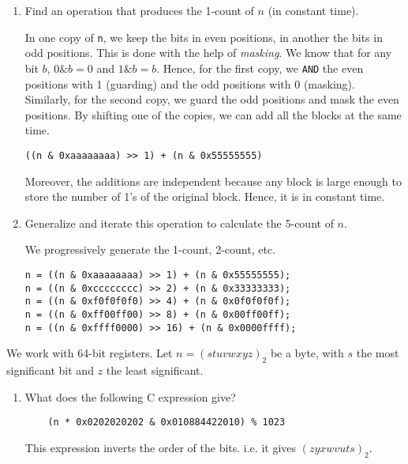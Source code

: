 \documentclass[11pt]{article}
\begin{document}
\begin{enumerate} \addtocounter{enumi}{2}
	\item Find an operation that produces the 1-count of $n$ (in constant time).
	\begin{solution}
		In one copy of \verb-n-, we keep the bits in even positions,
		in another the bits in odd positions. This is done with the help of \emph{masking}. We know that for any bit $b$, $0\&b=0$ and $1\&b=b$. Hence, for the first copy, we \texttt{AND} the even positions with 1 (guarding) and the odd positions with 0 (masking). Similarly, for the second copy, we guard the odd positions and mask the even positions.  By shifting one of the copies,
		we can add all the blocks at the same time.
		
		\verb-((n & 0xaaaaaaaa) >> 1) + (n & 0x55555555)-
		
		Moreover, the additions are independent because any block is
		large enough to store the number of 1's of the original block. Hence, it is in constant time.
	\end{solution}
	\item Generalize and iterate this operation to calculate the 5-count of $n$.
	\begin{solution}
		We progressively generate the 1-count, 2-count, etc.
		
		\verb-n = ((n & 0xaaaaaaaa) >> 1) + (n & 0x55555555);-\\
		\verb-n = ((n & 0xcccccccc) >> 2) + (n & 0x33333333);-\\
		\verb-n = ((n & 0xf0f0f0f0) >> 4) + (n & 0x0f0f0f0f);-\\
		\verb-n = ((n & 0xff00ff00) >> 8) + (n & 0x00ff00ff);-\\
		\verb-n = ((n & 0xffff0000) >> 16) + (n & 0x0000ffff);-
	\end{solution}
\end{enumerate}

We work with 64-bit registers. Let $n=(stuvwxyz)_2$ be a byte, with $s$ the most significant bit and $z$ the least significant. 
\begin{enumerate} \addtocounter{enumi}{4} 
	\item What does the following C expression give?

\begin{verbatim}
	(n * 0x0202020202 & 0x010884422010) % 1023
\end{verbatim}

\begin{solution}
	This expression inverts the order of the bits. i.e. it gives $(zyxwvuts)_2$.
	\end{solution}
\end{enumerate}
\end{document}
